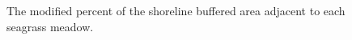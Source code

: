 \documentclass[12pt]{article}\usepackage[]{graphicx}\usepackage[]{color}
\begin{document}
\begin{figure}[H]

{\centering {} 

}

\caption{The modified percent of the shoreline buffered area adjacent to each seagrass meadow.}\label{fig:percentmod}
\end{figure}
\end{document}
